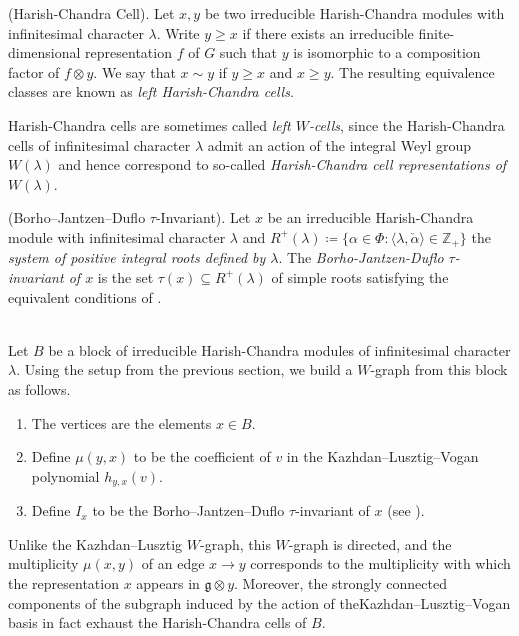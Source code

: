 \noindent\begin{definition}\textup{(Harish-Chandra Cell).} Let $x, y$ be two irreducible Harish-Chandra modules with infinitesimal character $\lambda$. Write $y \geq x$ if there exists an irreducible finite-dimensional representation $f$ of $G$ such that $y$ is isomorphic to a composition factor of $f \otimes y$. We say that $x \sim y$ if $y \geq x$ and $x \geq y$. The resulting equivalence classes are known as {\em left Harish-Chandra cells}.\newpage
\end{definition}

\noindent\begin{remark} Harish-Chandra cells are sometimes called {\em left $W$-cells}, since the Harish-Chandra cells of infinitesimal character $\lambda$ admit an action of the integral Weyl group $W(\lambda)$ and hence correspond to so-called {\em Harish-Chandra cell representations of $W(\lambda)$}.\\
\end{remark}

\noindent\begin{definition}\textup{(Borho--Jantzen--Duflo $\tau$-Invariant).} Let $x$ be an irreducible Harish-Chandra module with infinitesimal character $\lambda$ and $R^+(\lambda) \coloneqq \{\alpha \in \Phi : \langle\lambda, \check{\alpha}\rangle \in \mathbb{Z}_+\}$ the {\em system of positive integral roots defined by $\lambda$}. The {\em Borho-Jantzen-Duflo $\tau$-invariant of $x$} is the set $\tau(x) \subseteq R^+(\lambda)$ of simple roots satisfying the equivalent conditions of \cite[Corollary 7.2.27]{Vog81}.\\[\linespacing]
\end{definition}

\noindent\\ Let $B$ be a block of irreducible Harish-Chandra modules of infinitesimal character $\lambda$. Using the setup from the previous section, we build a $W$-graph from this block as follows.
\begin{enumerate}[label=$\bullet$, leftmargin=4\parindent]
\item The vertices are the elements $x \in B$.
\item Define $\mu(y, x)$ to be the coefficient of $v$ in the Kazhdan--Lusztig--Vogan polynomial $h_{y,x}(v)$.
\item Define $I_x$ to be the Borho--Jantzen--Duflo $\tau$-invariant of $x$ (see \cite[Definition 7.3.8]{Vog81}).
\end{enumerate}
\noindent Unlike the Kazhdan--Lusztig $W$-graph, this $W$-graph is directed, and the multiplicity $\mu(x, y)$ of an edge $x \to y$ corresponds to the multiplicity with which the representation $x$ appears in ${\mathfrak{g} \otimes y}$. Moreover, the strongly connected components of the subgraph induced by the action of the\linebreak Kazhdan--Lusztig--Vogan basis in fact exhaust the Harish-Chandra cells of $B$.\\

